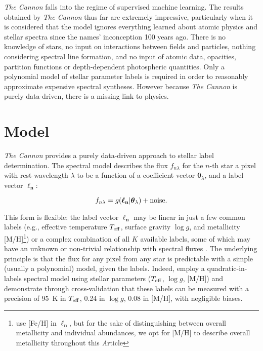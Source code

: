 \documentclass[useAMS,usenatbib]{mn2e}
\newcommand\article{\textit Article}
\newcommand\tc{\textit{The Cannon} }
\newcommand\lv{\mathbf{\boldsymbol\ell_n}}
\newcommand\cv{{\boldsymbol\theta}_\lambda}
\newcommand\given{|}
\begin{document}

\tc{} falls into the regime of supervised machine learning. The results obtained by \tc{} thus far are extremely impressive, particularly when it is considered that the model ignores everything learned about atomic physics and stellar spectra since the names' inconception 100 years ago. There is no knowledge of stars, no input on interactions between fields and particles, nothing considering spectral line formation, and no input of atomic data, opacities, partition functions or depth-dependent photospheric quantities. Only a polynomial model of stellar parameter labels is required in order to reasonably approximate expensive spectral syntheses. However because \tc is purely data-driven, there is a missing link to physics.




\section{Model}

\tc{} provides a purely data-driven approach to stellar label determination. The
spectral model describes the flux $f_{n\lambda}$ for the $n$-th star a pixel with rest-wavelength $\lambda$ to be a function
of a coefficient vector $\cv$, and a label vector $\lv$:

\begin{equation}
    f_{n\lambda} = g(\lv\given\cv) + {\rm noise}.
\end{equation}

This form is flexible: the label vector $\lv$ may be linear in just a few common
labels (e.g., effective temperature $T_{\rm eff}$, surface gravity $\log{g}$, and
metallicity [M/H]\footnote{\citet{Ness2015} use [Fe/H] in $\lv$, but for the 
sake of distinguishing between overall metallicity and individual abundances,
we opt for [M/H] to describe overall metallicity throughout this \article{}})
or a complex combination of all $K$ available labels, some of which may have an
 unknown or non-trivial relationship with spectral fluxes \citep[e.g., mass, 
 ages, see][]{ness_2015b}. The underlying principle
is that the flux for any pixel from any star is predictable with a simple (usually
 a polynomial) model, given the labels. Indeed, \citet{Ness2015}
employ a quadratic-in-labels spectral model using stellar
parameters ($T_{\rm eff}$, $\log{g}$, [M/H])
and demonstrate through cross-validation that these labels can be 
measured with a precision of 95~K in $T_{\rm eff}$, 0.24 in $\log{g}$, 0.08 in 
[M/H], with negligible biases. 
\end{document}
